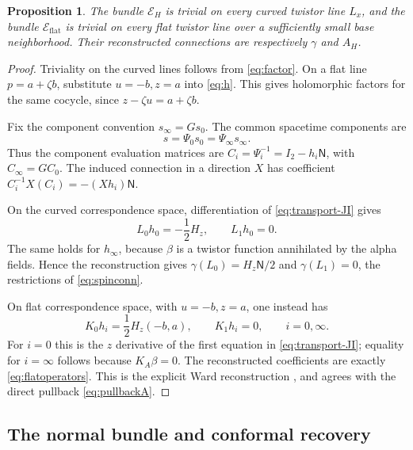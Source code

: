 \documentclass[11pt]{article}
\numberwithin{equation}{section}
\newtheorem{proposition}[theorem]{Proposition}
\theoremstyle{definition}
\theoremstyle{remark}
\newcommand{\NN}{\mathsf N}
\newcommand{\II}{I_2}
\begin{document}
\begin{proposition}\label{prop:two-reconstructions}
The bundle $\mathcal E_H$ is trivial on every curved twistor line $L_x$, and the bundle $\mathcal E_{\mathrm{flat}}$ is trivial on every flat twistor line over a sufficiently small base neighborhood. Their reconstructed connections are respectively $\gamma$ and $A_H$.
\end{proposition}
\begin{proof}
Triviality on the curved lines follows from \eqref{eq:factor}. On a flat line $p=a+\zeta b$, substitute $u=-b,z=a$ into \eqref{eq:h}. This gives holomorphic factors for the same cocycle, since $z-\zeta u=a+\zeta b$.

Fix the component convention $s_\infty=Gs_0$. The common spacetime components are
\begin{equation}\label{eq:componentconvention}
s=\Psi_0s_0=\Psi_\infty s_\infty.
\end{equation}
Thus the component evaluation matrices are $C_i=\Psi_i^{-1}=\II-h_i\NN$, with $C_\infty=GC_0$. The induced connection in a direction $X$ has coefficient $C_i^{-1}X(C_i)=-(Xh_i)\NN$.

On the curved correspondence space, differentiation of \eqref{eq:transport-JI} gives
\[
L_0h_0=-\frac12H_z,\qquad L_1h_0=0.
\]
The same holds for $h_\infty$, because $\beta$ is a twistor function annihilated by the alpha fields. Hence the reconstruction gives $\gamma(L_0)=H_z\NN/2$ and $\gamma(L_1)=0$, the restrictions of \eqref{eq:spinconn}.

On flat correspondence space, with $u=-b,z=a$, one instead has
\begin{equation}\label{eq:flat-h-derivatives}
K_0h_i=\frac12H_z(-b,a),\qquad K_1h_i=0,
\qquad i=0,\infty.
\end{equation}
For $i=0$ this is the $z$ derivative of the first equation in \eqref{eq:transport-JI}; equality for $i=\infty$ follows because $K_A\beta=0$. The reconstructed coefficients are exactly \eqref{eq:flatoperators}. This is the explicit Ward reconstruction \cite{Ward}, and agrees with the direct pullback \eqref{eq:pullbackA}.
\end{proof}

\subsection{The normal bundle and conformal recovery}
\end{document}

